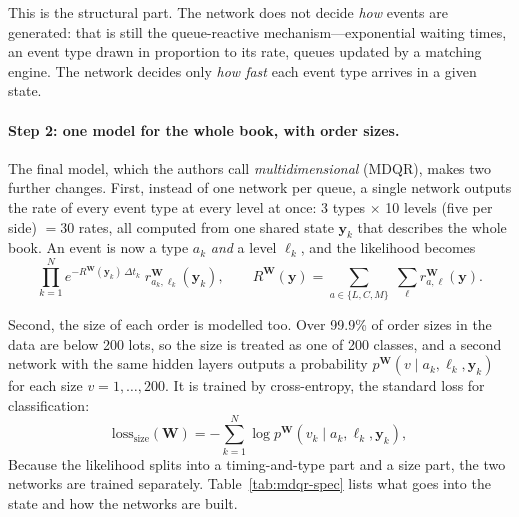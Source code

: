 This is the structural part. The network does not decide \emph{how} events are generated: that is still the
queue-reactive mechanism---exponential waiting times, an event type drawn in proportion to its rate, queues
updated by a matching engine. The network decides only \emph{how fast} each event type arrives in a given state.

\paragraph{Step 2: one model for the whole book, with order sizes.} The final model, which the authors call
\emph{multidimensional} (MDQR), makes two further changes. First, instead of one network per queue, a single
network outputs the rate of every event type at every level at once: 3 types $\times$ 10 levels (five per side)
$=30$ rates, all computed from one shared state $\mathbf{y}_k$ that describes the whole book. An event is now a
type $a_k$ \emph{and} a level $\ell_k$, and the likelihood becomes
\begin{equation}
\prod_{k=1}^{N} e^{-R^{\mathbf{W}}(\mathbf{y}_k)\,\Delta t_k}\; r^{\mathbf{W}}_{a_k,\ell_k}(\mathbf{y}_k),
\qquad
R^{\mathbf{W}}(\mathbf{y}) = \sum_{a\in\{L,C,M\}}\;\sum_{\ell} r^{\mathbf{W}}_{a,\ell}(\mathbf{y}).
\label{eq:mdqr-lik}
\end{equation}

Second, the size of each order is modelled too. Over 99.9\% of order sizes in the data are below 200 lots, so the
size is treated as one of 200 classes, and a second network with the same hidden layers outputs a probability
$p^{\mathbf{W}}(v\mid a_k,\ell_k,\mathbf{y}_k)$ for each size $v=1,\dots,200$. It is trained by cross-entropy,
the standard loss for classification:
\begin{equation}
\text{loss}_{\text{size}}(\mathbf{W}) = -\sum_{k=1}^{N}\log p^{\mathbf{W}}(v_k\mid a_k,\ell_k,\mathbf{y}_k),
\label{eq:mdqr-size}
\end{equation}
Because the likelihood splits into a timing-and-type part and a size part, the two networks are trained
separately. Table~\ref{tab:mdqr-spec} lists what goes into the state and how the networks are built.

